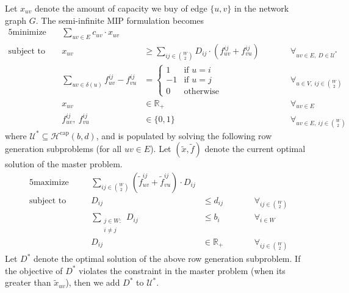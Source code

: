 Let $x_{uv}$ denote the amount of capacity we buy of edge $\{u,v\}$ in the network graph $G$.
The semi-infinite MIP formulation becomes
\begin{alignat*}{5}
    \text{minimize}\ && \sum_{uv \in E} c_{uv} \cdot x_{uv} &&& \\
    \text{subject to}\ && x_{uv} &\ge \sum_{ij \in \binom{W}{2}} D_{ij} \cdot (f_{uv}^{ij} + f_{vu}^{ij}) &&\qquad \forall_{uv \in E,\ D \in \mathcal U^*} \\
    && \sum_{uv \in \delta(u)} f_{uv}^{ij} - f_{vu}^{ij} &= \begin{cases}
                                                                1 & \text{if $u = i$} \\
                                                                -1 & \text{if $u = j$} \\
                                                                0 & \text{otherwise}
    \end{cases} &&\qquad \forall_{u \in V,\ ij \in \binom{W}{2}} \\
    && x_{uv} &\in \mathbb{R}_+ &&\qquad \forall_{uv \in E} \\
    && f_{uv}^{ij},\ f_{vu}^{ij} &\in \{ 0, 1 \} &&\qquad \forall_{uv \in E,\ ij \in \binom{W}{2}}
\end{alignat*}
where $\mathcal U^* \subseteq \mathcal H^\text{cap}(b, d)$, and is populated by solving the following row generation subproblems (for all $uv \in E$).
Let $(\tilde x, \tilde f)$ denote the current optimal solution of the master problem.
\begin{alignat}{5}
    \text{maximize}\quad && \sum_{ij \in \binom{W}{2}} (\tilde f_{uv}^{ij} + \tilde f_{vu}^{ij}) \cdot D_{ij} &&& \\
    \text{subject to}\quad && D_{ij} &\le d_{ij} &&\qquad \forall_{ij \in \binom W 2} \label{eq:cap:constr1}\\
    && \sum_{\substack{j \in W:\\i \neq j}} D_{ij} &\le b_i &&\qquad \forall_{i \in W} \label{eq:cap:constr2} \\
    && D_{ij} &\in \mathbb{R}_+ &&\qquad \forall_{ij \in \binom{W}{2}}
\end{alignat}
Let $D^*$ denote the optimal solution of the above row generation subproblem.
If the objective of $D^*$ violates the constraint in the master problem (when its greater than $\tilde x_{uv}$), then we add $D^*$ to $\mathcal U^*$.

